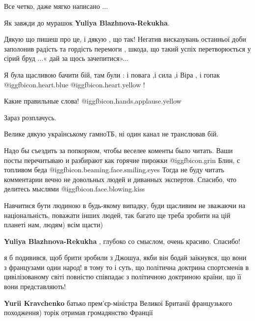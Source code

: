 \begin{itemize}
\begin{itemize}
\end{itemize} %

Все четко, даже мягко написано
...


Як завжди до мурашок \textbf{Yuliya Blazhnova-Rekukha}.

Дякую що пишеш про це, і дякую , що так! Негатив висказувань останньої доби
заполонив радість та гордість перемоги , шкода, що такий успіх перетворюється у
сірий бруд ...« дай за щось зачепитися»...

Я була щасливою бачити бій, там були : і повага ,і сила ,і Віра , і гопак
@igg{fbicon.heart.blue}  @igg{fbicon.heart.yellow} !

Какие правильные слова!  @igg{fbicon.hands.applause.yellow} 

Зараз розплачусь.

Велике дякую українському гамноТБ, ні один канал не транслював бій.

Надо бы съездить за попкорном, чтобы веселее коменты было читать. Ваши посты перечитываю и разбирают как горячие пирожки  @igg{fbicon.grin} 
Блин, с топливом беда  @igg{fbicon.beaming.face.smiling.eyes} 
Тогда не буду читать комментарии вечно не довольных людей и диванных экспертов.
Спасибо, что делитесь мыслями  @igg{fbicon.face.blowing.kiss} 


Навчитися бути людиною в будь-якому випадку, буди щасливим не зважаючи на
національність, поважати інших людей, так багато ще треба зробити на цій
планеті нам, людям) всім щасти)

\textbf{Yuliya Blazhnova-Rekukha} , глубоко со смыслом, очень красиво. Спасибо!


я б подивився, щоб брити зробили з Джошуа, якби він бодай заїкнувся, що вони з
французами один народ! в тому то і суть, що політична доктрина спортсменів в
цивілізованому світі повністю співпадає з політичною доктриною країни, що її
вони представляють!

\begin{itemize} %
\textbf{Yurii Kravchenko} батько прем'єр-міністра Великої Британії французького походження) торік отримав громадянство Франції


\end{itemize}
\end{itemize}
